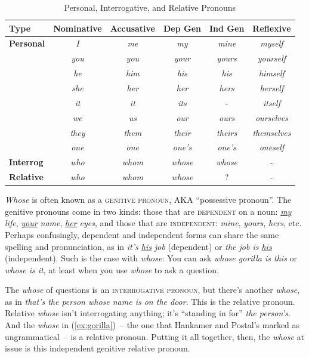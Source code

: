 \begin{table}[h]
\centering
\begin{tabular}{lccccc}
\hline
\textbf{Type} & \textbf{Nominative} & \textbf{Accusative} & \textbf{Dep Gen} & \textbf{Ind Gen} & \textbf{Reflexive} \\ 
\hline
\textbf{Personal} & \textit{I} & \textit{me} & \textit{my} & \textit{mine} & \textit{myself} \\ 
 & \textit{you} & \textit{you} & \textit{your} & \textit{yours} & \textit{yourself} \\ 
 & \textit{he} & \textit{him} & \textit{his} & \textit{his} & \textit{himself} \\ 
 & \textit{she} & \textit{her} & \textit{her} & \textit{hers} & \textit{herself} \\ 
 & \textit{it} & \textit{it} & \textit{its} & - & \textit{itself} \\ 
 & \textit{we} & \textit{us} & \textit{our} & \textit{ours} & \textit{ourselves} \\ 
 & \textit{they} & \textit{them} & \textit{their} & \textit{theirs} & \textit{themselves} \\ 
 & \textit{one} & \textit{one} & \textit{one's} & \textit{one's} & \textit{oneself} \\
\textbf{Interrog} & \textit{who} & \textit{whom} & \textit{whose} & \textit{whose} & - \\ 
\textbf{Relative} & \textit{who} & \textit{whom} & \textit{whose} & ? & - \\
\hline
\end{tabular}
\caption{Personal, Interrogative, and Relative Pronouns}
\label{tab:pronouns}
\end{table}

\textit{Whose} is often known as a \textsc{genitive pronoun}, AKA ``possessive pronoun''. The genitive pronouns come in two kinds: those that are \textsc{dependent} on a noun: \textit{\uline{my} life}, \textit{\uline{your} name}, \textit{\uline{her} eyes}, and those that are \textsc{independent}: \textit{mine}, \textit{yours}, \textit{hers}, etc. Perhaps confusingly, dependent and independent forms can share the same spelling and pronunciation, as in \textit{it's \uline{his} job} (dependent) or \textit{the job is \uline{his}} (independent). Such is the case with \textit{whose}: You can ask \textit{whose gorilla is this} or \textit{whose is it}, at least when you use \textit{whose} to ask a question.

The \textit{whose} of questions is an \textsc{interrogative pronoun}, but there's another \textit{whose}, as in \textit{that's the person whose name is on the door}. This is the {relative pronoun}. Relative \textit{whose} isn't interrogating anything; it's ``standing in for'' \textit{the person's}. And the \textit{whose} in (\ref{ex:gorilla})~-- the one that Hankamer and Postal's marked as ungrammatical~-- is a relative pronoun. Putting it all together, then, the \textit{whose} at issue is this independent genitive relative pronoun.

